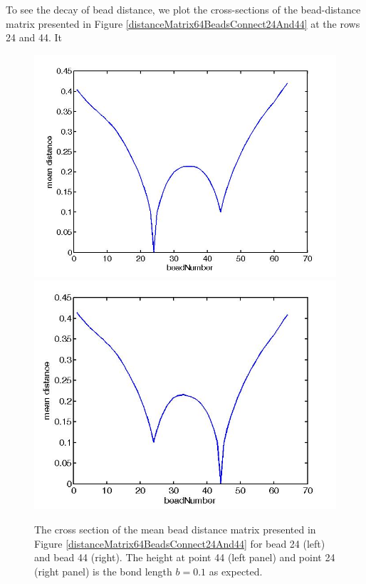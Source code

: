 \documentclass[12pt]{book}
\begin{document}
To see the decay of bead distance, we plot the cross-sections of the bead-distance matrix presented in Figure \ref{distanceMatrix64BeadsConnect24And44} at the rows 24 and 44. It 
\begin{figure}[H]
\includegraphics[scale=0.3]{crossectionAtRow24DistanceMatrix64BeadsConnect24And44}
\includegraphics[scale=0.32]{crossectionAtRow44DistanceMatrix64BeadsConnect24And44}
\caption{\scriptsize{The cross section of the mean bead distance matrix presented in Figure \ref{distanceMatrix64BeadsConnect24And44} for bead 24 (left) and bead 44 (right). The height at point 44 (left panel) and point 24 (right panel) is the bond length $b=0.1$ as expected.}}
\label{crossectionAtRow24DistanceMatrix64BeadsConnect24And44}
\end{figure}
\end{document}
